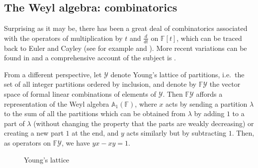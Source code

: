 \documentclass{commat}
\newcommand{\FF}{\mathbb{F}}
\newcommand{\wa}[1][1]{\mathbb{A}_{#1}}
\begin{document}
\subsection{The Weyl algebra: combinatorics}\label{SS:intro:wa:comb}

Surprising as it may be, there has been a great deal of combinatorics associated with the operators of multiplication by $t$ and $\frac{d}{dt}$ on $\FF[t]$, which can be traced back to Euler and Cayley (see for example \cite{hfS23} and \cite{aC57}). More recent variations can be found in \cite{lC73, BR87,mM11} and a comprehensive account of the subject is \cite{MS16}.

From a different perspective, let $\mathcal Y$ denote Young's lattice of partitions, i.e.\ the set of all integer partitions ordered by inclusion, and denote by $\FF\mathcal Y$ the vector space of formal linear combinations of elements of $\mathcal Y$. Then $\FF\mathcal Y$ affords a representation of the Weyl algebra $\wa(\FF)$, where $x$ acts by sending a partition $\lambda$ to the sum of all the partitions which can be obtained from $\lambda$ by adding $1$ to a part of $\lambda$ (without changing the property that the parts are weakly decreasing) or creating a new part $1$ at the end, and $y$ acts similarly but by subtracting $1$. Then, as operators on $\FF\mathcal Y$, we have $yx-xy=1$.

\begin{figure}[htbp]
	\begin{center}
		\caption{Young's lattice}
		\label{Ylattice}
	\end{center}
\end{figure}
\end{document}

